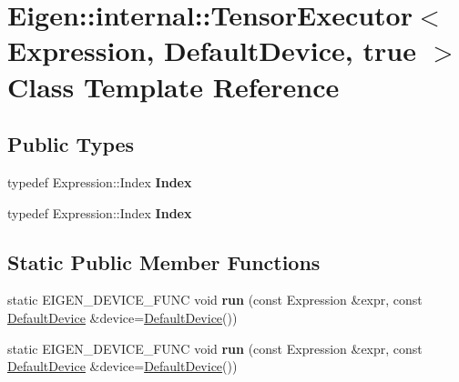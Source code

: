 \hypertarget{class_eigen_1_1internal_1_1_tensor_executor_3_01_expression_00_01_default_device_00_01true_01_4}{}\section{Eigen\+:\+:internal\+:\+:Tensor\+Executor$<$ Expression, Default\+Device, true $>$ Class Template Reference}
\label{class_eigen_1_1internal_1_1_tensor_executor_3_01_expression_00_01_default_device_00_01true_01_4}
\subsection*{Public Types}
\begin{DoxyCompactItemize}
\item 
\mbox{\label{class_eigen_1_1internal_1_1_tensor_executor_3_01_expression_00_01_default_device_00_01true_01_4_ab79119c2d9cc171c3eba60755b5da1ce}} 
typedef Expression\+::\+Index {\bfseries Index}
\item 
\mbox{\label{class_eigen_1_1internal_1_1_tensor_executor_3_01_expression_00_01_default_device_00_01true_01_4_ab79119c2d9cc171c3eba60755b5da1ce}} 
typedef Expression\+::\+Index {\bfseries Index}
\end{DoxyCompactItemize}
\subsection*{Static Public Member Functions}
\begin{DoxyCompactItemize}
\item 
\mbox{\label{class_eigen_1_1internal_1_1_tensor_executor_3_01_expression_00_01_default_device_00_01true_01_4_ae42547f21bf09faef10677ca987ed171}} 
static E\+I\+G\+E\+N\+\_\+\+D\+E\+V\+I\+C\+E\+\_\+\+F\+U\+NC void {\bfseries run} (const Expression \&expr, const \hyperlink{struct_eigen_1_1_default_device}{Default\+Device} \&device=\hyperlink{struct_eigen_1_1_default_device}{Default\+Device}())
\item 
\mbox{\label{class_eigen_1_1internal_1_1_tensor_executor_3_01_expression_00_01_default_device_00_01true_01_4_ae42547f21bf09faef10677ca987ed171}} 
static E\+I\+G\+E\+N\+\_\+\+D\+E\+V\+I\+C\+E\+\_\+\+F\+U\+NC void {\bfseries run} (const Expression \&expr, const \hyperlink{struct_eigen_1_1_default_device}{Default\+Device} \&device=\hyperlink{struct_eigen_1_1_default_device}{Default\+Device}())
\end{DoxyCompactItemize}


